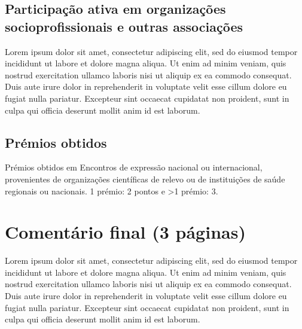 \documentclass{report}
\begin{document}
\section{Participação ativa em organizações socioprofissionais e outras associações}
Lorem ipsum dolor sit amet, consectetur adipiscing elit, sed do eiusmod tempor incididunt ut labore et dolore magna aliqua. Ut enim ad minim veniam, quis nostrud exercitation ullamco laboris nisi ut aliquip ex ea commodo consequat. Duis aute irure dolor in reprehenderit in voluptate velit esse cillum dolore eu fugiat nulla pariatur. Excepteur sint occaecat cupidatat non proident, sunt in culpa qui officia deserunt mollit anim id est laborum.

\section{Prémios obtidos}
Prémios obtidos em Encontros de expressão nacional ou internacional, provenientes de organizações científicas de
relevo ou de instituições de saúde regionais ou nacionais. 1 prémio: 2 pontos e >1 prémio: 3.

\chapter{Comentário final (3 páginas)}
Lorem ipsum dolor sit amet, consectetur adipiscing elit, sed do eiusmod tempor incididunt ut labore et dolore magna aliqua. Ut enim ad minim veniam, quis nostrud exercitation ullamco laboris nisi ut aliquip ex ea commodo consequat. Duis aute irure dolor in reprehenderit in voluptate velit esse cillum dolore eu fugiat nulla pariatur. Excepteur sint occaecat cupidatat non proident, sunt in culpa qui officia deserunt mollit anim id est laborum.
\end{document}
